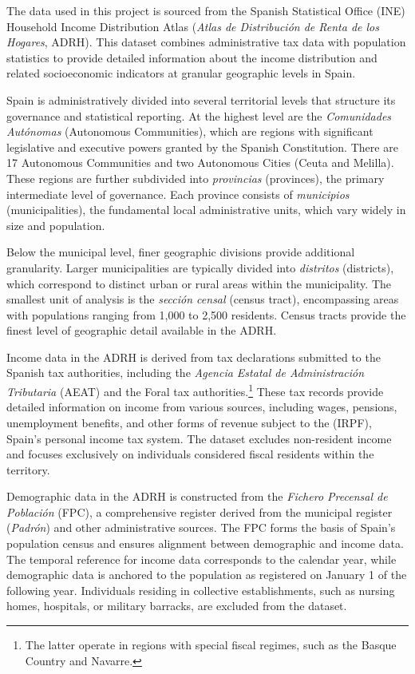 
The data used in this project is sourced from the Spanish Statistical Office (INE) Household Income Distribution Atlas (\textit{Atlas de Distribución de Renta de los Hogares}, ADRH). This dataset combines administrative tax data with population statistics to provide detailed information about the income distribution and related socioeconomic indicators at granular geographic levels in Spain.

Spain is administratively divided into several territorial levels that structure its governance and statistical reporting. At the highest level are the \textit{Comunidades Autónomas} (Autonomous Communities), which are regions with significant legislative and executive powers granted by the Spanish Constitution. There are 17 Autonomous Communities and two Autonomous Cities (Ceuta and Melilla). These regions are further subdivided into \textit{provincias} (provinces), the primary intermediate level of governance. Each province consists of \textit{municipios} (municipalities), the fundamental local administrative units, which vary widely in size and population.

Below the municipal level, finer geographic divisions provide additional granularity. Larger municipalities are typically divided into \textit{distritos} (districts), which correspond to distinct urban or rural areas within the municipality. The smallest unit of analysis is the \textit{sección censal} (census tract), encompassing areas with populations ranging from 1,000 to 2,500 residents. Census tracts provide the finest level of geographic detail available in the ADRH.

Income data in the ADRH is derived from tax declarations submitted to the Spanish tax authorities, including the \textit{Agencia Estatal de Administración Tributaria} (AEAT) and the Foral tax authorities.\footnote{The latter operate in regions with special fiscal regimes, such as the Basque Country and Navarre.} These tax records provide detailed information on income from various sources, including wages, pensions, unemployment benefits, and other forms of revenue subject to the  (IRPF), Spain's personal income tax system. The dataset excludes non-resident income and focuses exclusively on individuals considered fiscal residents within the territory.

Demographic data in the ADRH is constructed from the \textit{Fichero Precensal de Población} (FPC), a comprehensive register derived from the municipal register (\textit{Padrón}) and other administrative sources. The FPC forms the basis of Spain’s population census and ensures alignment between demographic and income data. The temporal reference for income data corresponds to the calendar year, while demographic data is anchored to the population as registered on January 1 of the following year. Individuals residing in collective establishments, such as nursing homes, hospitals, or military barracks, are excluded from the dataset.

